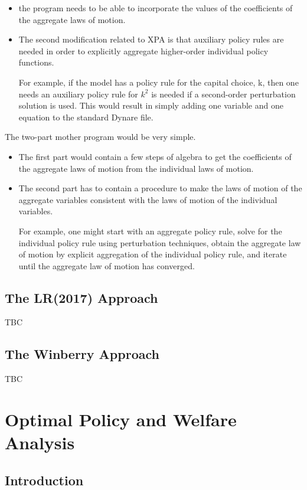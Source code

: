 \documentclass[cn,10pt,math=newtx,citestyle=gb7714-2015,bibstyle=gb7714-2015]{elegantbook}
\begin{document}
	\begin{itemize}
		\item the program needs to be able to incorporate the values of the coefficients of the aggregate laws of motion.
		\item The second modification related to XPA is that auxiliary policy rules are needed in order to explicitly aggregate higher-order individual policy functions.
		
		For example, if the model has a policy rule for the capital choice, k, then one needs an auxiliary policy rule for $k^2$ is needed if a second-order perturbation solution is used. This would result in simply adding one variable and one equation to the standard Dynare file.
	\end{itemize}
	
	The two-part mother program would be very simple.
	\begin{itemize}
		\item The first part would contain a few steps of algebra to get the coefficients of the aggregate laws of motion from the individual laws of motion.
		\item The second part has to contain a procedure to make the laws of motion of the aggregate variables consistent with the laws of motion of the individual variables.
		
		For example, one might start with an aggregate policy rule, solve for the individual policy rule using perturbation techniques, obtain the aggregate law of motion by explicit aggregation of the individual policy rule, and iterate until the aggregate law of motion has converged.
	\end{itemize}
	
	\section{The LR(2017) Approach}
	
	TBC
	
	\section{The Winberry Approach}
	
	TBC
	
	\chapter{Optimal Policy and Welfare Analysis}
	
	\section{Introduction}
	
\end{document}
